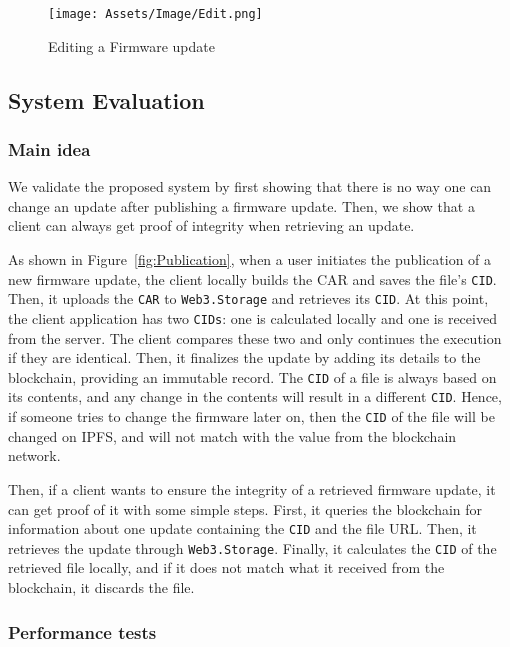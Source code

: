 \documentclass[conference]{IEEEtran}
\begin{document}
\begin{figure}[t]
\centering
\texttt{[image: Assets/Image/Edit.png]}
\caption{Editing a Firmware update}
\label{fig:Edit}
\vspace{-3mm}
\end{figure}

\subsection{System Evaluation}

\subsubsection{Main idea} We validate the proposed system by first showing that there is no way one can change an update after publishing a firmware update. Then, we show that a client can always get proof of integrity when retrieving an update.

As shown in Figure~\ref{fig:Publication}, when a user initiates the publication of a new firmware update, the client locally builds the CAR and saves the file's \texttt{CID}. Then, it uploads the \texttt{CAR} to \texttt{Web3.Storage} and retrieves its \texttt{CID}. At this point, the client application has two \texttt{CIDs}: one is calculated locally and one is received from the server. The client compares these two and only continues the execution if they are identical. Then, it finalizes the update by adding its details to the blockchain, providing an immutable record. The \texttt{CID} of a file is always based on its contents, and any change in the contents will result in a different \texttt{CID}. Hence, if someone tries to change the firmware later on, then the \texttt{CID} of the file will be changed on IPFS, and will not match with the value from the blockchain network.

Then, if a client wants to ensure the integrity of a retrieved firmware update, it can get proof of it with some simple steps. First, it queries the blockchain for information about one update containing the \texttt{CID} and the file URL. Then, it retrieves the update through \texttt{Web3.Storage}. Finally, it calculates the \texttt{CID} of the retrieved file locally, and if it does not match what it received from the blockchain, it discards the file.

\subsubsection{Performance tests}\label{sec:test}
\end{document}
